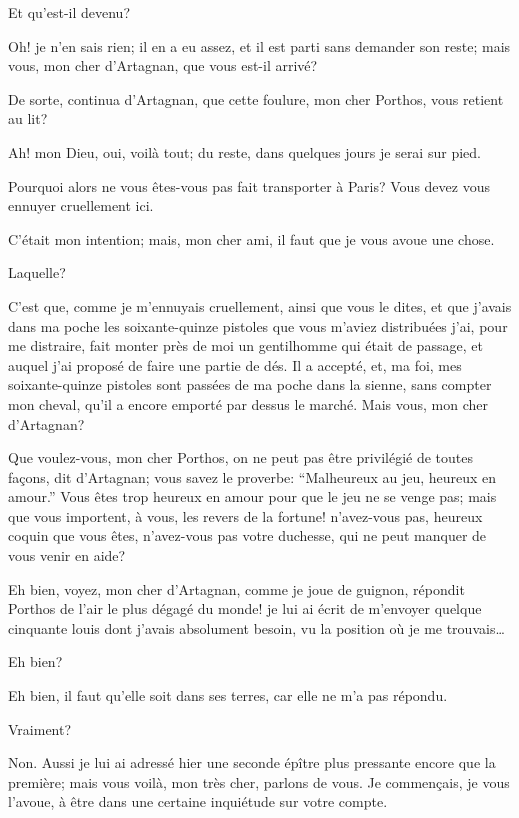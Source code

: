 \speak  Et qu'est-il devenu? 

\speak  Oh! je n'en sais rien; il en a eu assez, et il est parti sans demander son reste; mais vous, mon cher d'Artagnan, que vous est-il arrivé? 

\speak  De sorte, continua d'Artagnan, que cette foulure, mon cher Porthos, vous retient au lit? 

\speak  Ah! mon Dieu, oui, voilà tout; du reste, dans quelques jours je serai sur pied. 

\speak  Pourquoi alors ne vous êtes-vous pas fait transporter à Paris? Vous devez vous ennuyer cruellement ici. 

\speak  C'était mon intention; mais, mon cher ami, il faut que je vous avoue une chose. 

\speak  Laquelle? 

\speak  C'est que, comme je m'ennuyais cruellement, ainsi que vous le dites, et que j'avais dans ma poche les soixante-quinze pistoles que vous m'aviez distribuées j'ai, pour me distraire, fait monter près de moi un gentilhomme qui était de passage, et auquel j'ai proposé de faire une partie de dés. Il a accepté, et, ma foi, mes soixante-quinze pistoles sont passées de ma poche dans la sienne, sans compter mon cheval, qu'il a encore emporté par dessus le marché. Mais vous, mon cher d'Artagnan? 

\speak  Que voulez-vous, mon cher Porthos, on ne peut pas être privilégié de toutes façons, dit d'Artagnan; vous savez le proverbe: “Malheureux au jeu, heureux en amour.” Vous êtes trop heureux en amour pour que le jeu ne se venge pas; mais que vous importent, à vous, les revers de la fortune! n'avez-vous pas, heureux coquin que vous êtes, n'avez-vous pas votre duchesse, qui ne peut manquer de vous venir en aide? 

\speak  Eh bien, voyez, mon cher d'Artagnan, comme je joue de guignon, répondit Porthos de l'air le plus dégagé du monde! je lui ai écrit de m'envoyer quelque cinquante louis dont j'avais absolument besoin, vu la position où je me trouvais\dots 

\speak  Eh bien? 

\speak  Eh bien, il faut qu'elle soit dans ses terres, car elle ne m'a pas répondu. 

\speak  Vraiment? 

\speak  Non. Aussi je lui ai adressé hier une seconde épître plus pressante encore que la première; mais vous voilà, mon très cher, parlons de vous. Je commençais, je vous l'avoue, à être dans une certaine inquiétude sur votre compte. 

